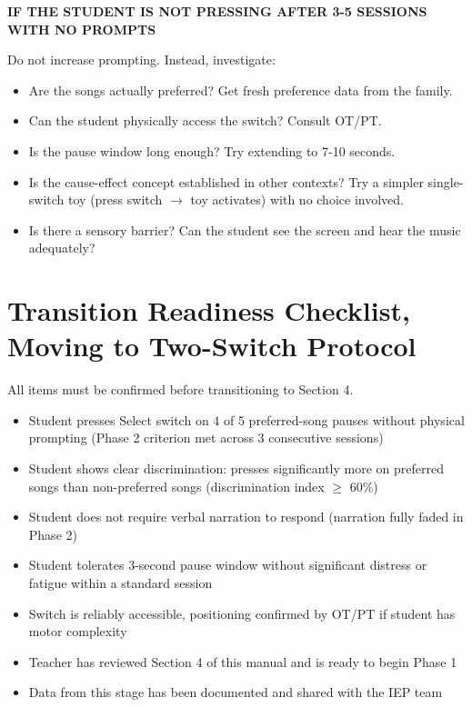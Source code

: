 \documentclass[justified,openright]{tufte-book}
\DeclareRobustCommand{\checkbox}{\(\square\)}
\begin{document}
\textbf{IF THE STUDENT IS NOT PRESSING AFTER 3-5 SESSIONS WITH NO
PROMPTS}

Do not increase prompting. Instead, investigate:
\begin{itemize}

\item Are the songs actually preferred? Get fresh preference data from the family.
\item Can the student physically access the switch? Consult OT/PT.
\item Is the pause window long enough? Try extending to 7-10 seconds.
\item Is the cause-effect concept established in other contexts? Try a simpler single-switch toy (press switch $\rightarrow$ toy activates) with no choice involved.
\item Is there a sensory barrier? Can the student see the screen and hear the music adequately?
\end{itemize}


\section{Transition Readiness Checklist, Moving to Two-Switch
Protocol}\label{transition-readiness-checklist-moving-to-two-switch-protocol}

All items must be confirmed before transitioning to Section 4.

\begin{itemize}

\item[\checkbox] 
Student presses Select switch on 4 of 5 preferred-song pauses without
  physical prompting (Phase 2 criterion met across 3 consecutive
  sessions)
\item[\checkbox] 
Student shows clear discrimination: presses significantly more on
  preferred songs than non-preferred songs (discrimination index $\geq$ 60\%)
\item[\checkbox] 
Student does not require verbal narration to respond (narration fully
  faded in Phase 2)
\item[\checkbox] 
Student tolerates 3-second pause window without significant distress
  or fatigue within a standard session
\item[\checkbox] 
Switch is reliably accessible, positioning confirmed by OT/PT if
  student has motor complexity
\item[\checkbox] 
Teacher has reviewed Section 4 of this manual and is ready to begin
  Phase 1
\item[\checkbox] 
Data from this stage has been documented and shared with the IEP team
\end{itemize}
\end{document}
